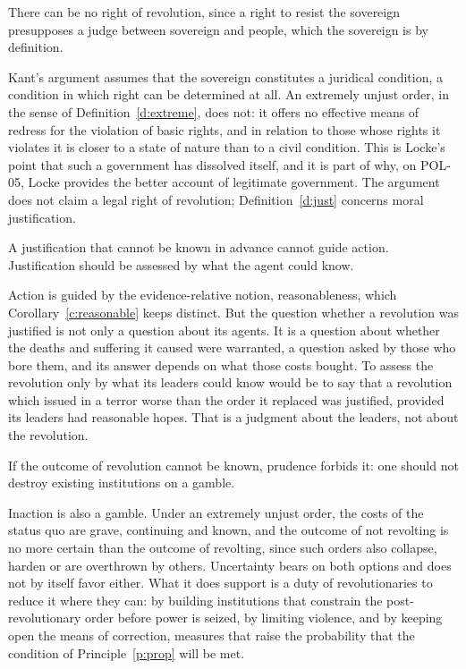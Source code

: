 \documentclass{situationist-preprint}
\begin{document}
\begin{objection}[Kant]
There can be no right of revolution, since a right to resist the sovereign presupposes a judge between sovereign and people, which the sovereign is by definition.
\end{objection}

\begin{reply}
Kant's argument assumes that the sovereign constitutes a juridical condition, a condition in which right can be determined at all. An extremely unjust order, in the sense of Definition~\ref{d:extreme}, does not: it offers no effective means of redress for the violation of basic rights, and in relation to those whose rights it violates it is closer to a state of nature than to a civil condition. This is Locke's point that such a government has dissolved itself, and it is part of why, on POL-05, Locke provides the better account of legitimate government. The argument does not claim a legal right of revolution; Definition~\ref{d:just} concerns moral justification.
\end{reply}

\begin{objection}
A justification that cannot be known in advance cannot guide action. Justification should be assessed by what the agent could know.
\end{objection}

\begin{reply}
Action is guided by the evidence-relative notion, reasonableness, which Corollary~\ref{c:reasonable} keeps distinct. But the question whether a revolution was justified is not only a question about its agents. It is a question about whether the deaths and suffering it caused were warranted, a question asked by those who bore them, and its answer depends on what those costs bought. To assess the revolution only by what its leaders could know would be to say that a revolution which issued in a terror worse than the order it replaced was justified, provided its leaders had reasonable hopes. That is a judgment about the leaders, not about the revolution.
\end{reply}

\begin{objection}[Burke]
If the outcome of revolution cannot be known, prudence forbids it: one should not destroy existing institutions on a gamble.
\end{objection}

\begin{reply}
Inaction is also a gamble. Under an extremely unjust order, the costs of the status quo are grave, continuing and known, and the outcome of not revolting is no more certain than the outcome of revolting, since such orders also collapse, harden or are overthrown by others. Uncertainty bears on both options and does not by itself favor either. What it does support is a duty of revolutionaries to reduce it where they can: by building institutions that constrain the post-revolutionary order before power is seized, by limiting violence, and by keeping open the means of correction, measures that raise the probability that the condition of Principle~\ref{p:prop} will be met.
\end{reply}
\end{document}
